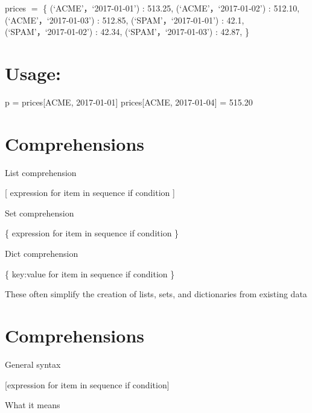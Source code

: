 \documentclass[
  letterpaper,
  DIV=11,
  numbers=noendperiod]{scrreprt}
\newenvironment{Shaded}{\begin{snugshade}}{\end{snugshade}}
\newcommand{\FloatTok}[1]{\textcolor[rgb]{0.68,0.00,0.00}{#1}}
\newcommand{\NormalTok}[1]{\textcolor[rgb]{0.00,0.23,0.31}{#1}}
\newcommand{\OperatorTok}[1]{\textcolor[rgb]{0.37,0.37,0.37}{#1}}
\newcommand{\StringTok}[1]{\textcolor[rgb]{0.13,0.47,0.30}{#1}}
\begin{document}
prices \(=\) \{ (`ACME'，`2017-01-01') : 513.25, (`ACME'，`2017-01-02')
: 512.10, (`ACME'，`2017-01-03') : 512.85, (`SPAM'，`2017-01-01') :
42.1, (`SPAM'，`2017-01-02') : 42.34, (`SPAM'，`2017-01-03') : 42.87, \}


\chapter{Usage:}\label{usage}

\begin{Shaded}
\begin{Highlighting}[]
\NormalTok{p }\OperatorTok{=}\NormalTok{ prices[}\StringTok{\textquotesingle{}ACME\textquotesingle{}}\NormalTok{, }\StringTok{\textquotesingle{}2017{-}01{-}01\textquotesingle{}}\NormalTok{]}
\NormalTok{prices[}\StringTok{\textquotesingle{}ACME\textquotesingle{}}\NormalTok{, }\StringTok{\textquotesingle{}2017{-}01{-}04\textquotesingle{}}\NormalTok{] }\OperatorTok{=} \FloatTok{515.20} 
\end{Highlighting}
\end{Shaded}


\chapter{Comprehensions}\label{comprehensions}

List comprehension

{[} expression for item in sequence if condition {]}

Set comprehension

\{ expression for item in sequence if condition \}

Dict comprehension

\{ key:value for item in sequence if condition \}

These often simplify the creation of lists, sets, and dictionaries from
existing data


\chapter{Comprehensions}\label{comprehensions-1}

General syntax

{[}expression for item in sequence if condition{]}

What it means
\end{document}
